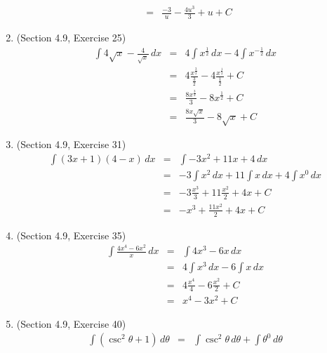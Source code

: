 \documentclass{article}
\begin{document}
\begin{enumerate}
\begin{eqnarray}
                                         &=& \frac{-3}{u} - \frac{4u^3}{3} + u + C
        \end{eqnarray}
    \item (Section 4.9, Exercise 25)
        \begin{eqnarray}
            \int{4\sqrt{x} - \frac{4}{\sqrt{x}}}\,dx &=& 4\int{x^{\frac{1}{2}}}\,dx - 4\int{x^{-\frac{1}{2}}}\,dx \\
                                                     &=& 4\frac{x^{\frac{3}{2}}}{\frac{3}{2}} - 4\frac{x^{\frac{1}{2}}}{\frac{1}{2}} + C \\
                                                     &=& \frac{8x^{\frac{3}{2}}}{3} - 8x^{\frac{1}{2}} + C \\
                                                     &=& \frac{8x\sqrt{x}}{3} - 8\sqrt{x} + C
        \end{eqnarray}
    \item (Section 4.9, Exercise 31)
        \begin{eqnarray}
            \int{\left(3x + 1\right)\left(4 - x\right)}\,dx &=& \int{-3x^2 + 11x + 4}\,dx \\
                                                            &=& -3\int{x^2}\,dx + 11\int{x}\,dx + 4\int{x^0}\,dx \\
                                                            &=& -3\frac{x^3}{3} + 11\frac{x^2}{2} + 4x + C \\
                                                            &=& -x^3 + \frac{11x^2}{2} + 4x + C
        \end{eqnarray}
    \item (Section 4.9, Exercise 35)
        \begin{eqnarray}
            \int{\frac{4x^4 - 6x^2}{x}}\,dx &=& \int{4x^3 - 6x}\,dx \\
                                            &=& 4\int{x^3}\,dx - 6\int{x}\,dx \\
                                            &=& 4\frac{x^4}{4} - 6\frac{x^2}{2} + C \\
                                            &=& x^4 - 3x^2 + C
        \end{eqnarray}
    \item (Section 4.9, Exercise 40)
        \begin{eqnarray}
            \int{\left(\csc^2{\theta} + 1\right)}\,d\theta &=& \int{\csc^2{\theta}}\,d\theta + \int{\theta^0}\,d\theta \\

\end{eqnarray}
\end{enumerate}
\end{document}
